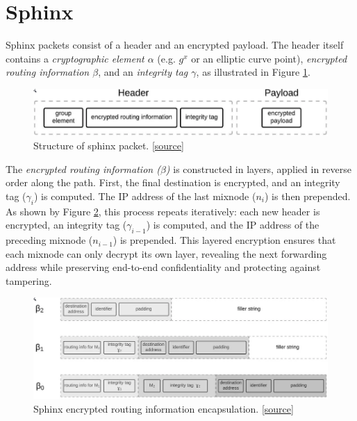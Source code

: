 \section{Sphinx}
Sphinx packets consist of a header and an encrypted payload. 
The header itself contains a \textit{cryptographic element $\alpha$} (e.g. $g^x$ or an elliptic curve point), \textit{encrypted routing information $\beta$}, and an \textit{integrity tag $\gamma$}, as illustrated in Figure \ref{fig:sphinx_structure}.

\begin{figure}[h]
    \centering
    \includegraphics[width=0.9\linewidth]{Images/sphinx_structure.png}
    \caption{Structure of sphinx packet. \href{https://blog.nymtech.net/sphinx-tl-dr-the-data-packet-that-can-anonymize-bitcoin-and-the-internet-18d152c6e4dc}{[source]}}
    \label{fig:sphinx_structure}
\end{figure}

The \textit{encrypted routing information ($\beta$)} is constructed in layers, applied in reverse order along the path.
First, the final destination is encrypted, and an integrity tag ($\gamma_i$) is computed. 
The IP address of the last mixnode ($n_i$) is then prepended.
As shown by Figure \ref{fig:sphinx_header}, this process repeats iteratively: each new header is encrypted, an integrity tag ($\gamma_{i-1}$) is computed, and the IP address of the preceding mixnode ($n_{i-1}$) is prepended.
This layered encryption ensures that each mixnode can only decrypt its own layer, revealing the next forwarding address while preserving end-to-end confidentiality and protecting against tampering.

\begin{figure}[h]
    \centering
    \includegraphics[width=\linewidth]{Images/sphinx_header.png}
    \caption{Sphinx encrypted routing information encapsulation. \href{https://blog.nymtech.net/sphinx-tl-dr-the-data-packet-that-can-anonymize-bitcoin-and-the-internet-18d152c6e4dc}{[source]}}
    \label{fig:sphinx_header}
\end{figure}

